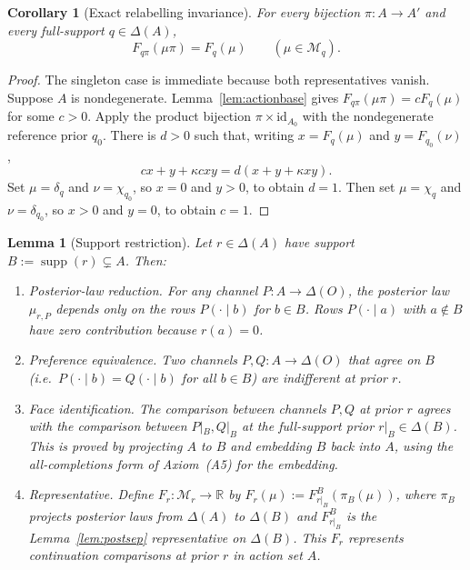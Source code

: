 \documentclass[11pt,a4paper]{article}
\newtheorem{lemma}[theorem]{Lemma}
\newtheorem{corollary}[theorem]{Corollary}
\theoremstyle{definition}
\newcommand{\R}{\mathbb R}
\newcommand{\1}{\mathbf 1}
\begin{document}
\begin{corollary}[Exact relabelling invariance]\label{cor:permutationinvariance}
For every bijection $\pi:A\to A'$ and every full-support $q\in\Delta(A)$,
\[
F_{q\pi}(\mu\pi)=F_q(\mu)
\qquad(\mu\in\mathcal M_q).
\]
\end{corollary}

\begin{proof}
The singleton case is immediate because both representatives vanish.  Suppose $A$ is nondegenerate.  Lemma~\ref{lem:actionbase}
gives $F_{q\pi}(\mu\pi)=cF_q(\mu)$ for some $c>0$.  Apply the product bijection
$\pi\times\mathrm{id}_{A_0}$ with the nondegenerate reference prior $q_0$.  There is $d>0$ such that, writing
$x=F_q(\mu)$ and $y=F_{q_0}(\nu)$,
\[
cx+y+\kappa cxy=d(x+y+\kappa xy).
\]
Set $\mu=\delta_q$ and $\nu=\chi_{q_0}$, so $x=0$ and $y>0$, to obtain $d=1$.  Then set
$\mu=\chi_q$ and $\nu=\delta_{q_0}$, so $x>0$ and $y=0$, to obtain $c=1$.
\end{proof}

\begin{lemma}[Support restriction]\label{lem:supprestrict}
Let $r\in\Delta(A)$ have support $B:=\operatorname{supp}(r)\subsetneq A$.  Then:
\begin{enumerate}
\item[(i)] \emph{Posterior-law reduction.}  For any channel $P:A\to\Delta(O)$, the posterior law $\mu_{r,P}$ depends only
on the rows $P(\cdot\mid b)$ for $b\in B$.  Rows $P(\cdot\mid a)$ with $a\notin B$ have zero contribution because $r(a)=0$.
\item[(ii)] \emph{Preference equivalence.}  Two channels $P,Q:A\to\Delta(O)$ that agree on $B$ (i.e.\ $P(\cdot\mid b)=Q(\cdot\mid b)$
for all $b\in B$) are indifferent at prior $r$.
\item[(iii)] \emph{Face identification.}  The comparison between channels $P,Q$ at prior $r$ agrees with the comparison
between $P|_B,Q|_B$ at the full-support prior $r|_B\in\Delta(B)$.  This is proved by projecting $A$ to $B$ and embedding
$B$ back into $A$, using the all-completions form of Axiom~\textup{(A5)} for the embedding.
\item[(iv)] \emph{Representative.}  Define $F_r:\mathcal M_r\to\R$ by $F_r(\mu):=F_{r|_B}^B(\pi_B(\mu))$, where $\pi_B$
projects posterior laws from $\Delta(A)$ to $\Delta(B)$ and $F_{r|_B}^B$ is the Lemma~\ref{lem:postsep} representative
on $\Delta(B)$.  This $F_r$ represents continuation comparisons at prior $r$ in action set $A$.
\end{enumerate}
\end{lemma}
\end{document}

